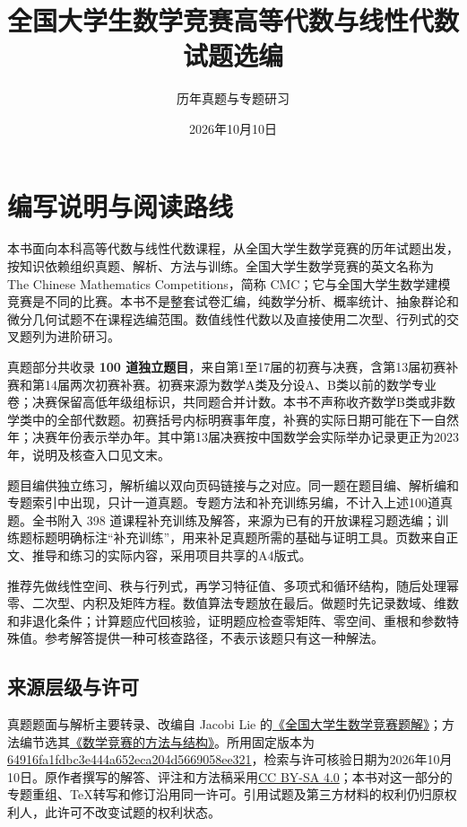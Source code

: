 \documentclass[UTF8,12pt,a4paper,fontset=fandol]{ctexart}
\title{全国大学生数学竞赛高等代数与线性代数试题选编}
\author{历年真题与专题研习}
\date{2026年10月10日}
\begin{document}
\maketitle
\section*{编写说明与阅读路线}
本书面向本科高等代数与线性代数课程，从全国大学生数学竞赛的历年试题出发，按知识依赖组织真题、解析、方法与训练。全国大学生数学竞赛的英文名称为 The Chinese Mathematics Competitions，简称 CMC；它与全国大学生数学建模竞赛是不同的比赛。本书不是整套试卷汇编，纯数学分析、概率统计、抽象群论和微分几何试题不在课程选编范围。数值线性代数以及直接使用二次型、行列式的交叉题列为进阶研习。

真题部分共收录 \textbf{100 道独立题目}，来自第1至17届的初赛与决赛，含第13届初赛补赛和第14届两次初赛补赛。初赛来源为数学A类及分设A、B类以前的数学专业卷；决赛保留高低年级组标识，共同题合并计数。本书不声称收齐数学B类或非数学类中的全部代数题。初赛括号内标明赛事年度，补赛的实际日期可能在下一自然年；决赛年份表示举办年。其中第13届决赛按中国数学会实际举办记录更正为2023年，说明及核查入口见文末。

题目编供独立练习，解析编以双向页码链接与之对应。同一题在题目编、解析编和专题索引中出现，只计一道真题。专题方法和补充训练另编，不计入上述100道真题。全书附入 398 道课程补充训练及解答，来源为已有的开放课程习题选编；训练题标题明确标注“补充训练”，用来补足真题所需的基础与证明工具。页数来自正文、推导和练习的实际内容，采用项目共享的A4版式。

推荐先做线性空间、秩与行列式，再学习特征值、多项式和循环结构，随后处理幂零、二次型、内积及矩阵方程。数值算法专题放在最后。做题时先记录数域、维数和非退化条件；计算题应代回核验，证明题应检查零矩阵、零空间、重根和参数特殊值。参考解答提供一种可核查路径，不表示该题只有这一种解法。

\subsection*{来源层级与许可}
真题题面与解析主要转录、改编自 Jacobi Lie 的\href{https://github.com/lzxcr/cmc-mathematics}{《全国大学生数学竞赛题解》}；方法编节选其\href{https://github.com/lzxcr/cmc-mathematics}{《数学竞赛的方法与结构》}。所用固定版本为 \href{https://github.com/lzxcr/cmc-mathematics/tree/64916fa1fdbc3e444a652eca204d5669058ee321}{64916fa1fdbc3e444a652eca204d5669058ee321}，检索与许可核验日期为2026年10月10日。原作者撰写的解答、评注和方法稿采用\href{https://creativecommons.org/licenses/by-sa/4.0/}{CC BY-SA 4.0}；本书对这一部分的专题重组、TeX转写和修订沿用同一许可。引用试题及第三方材料的权利仍归原权利人，此许可不改变试题的权利状态。
\end{document}
